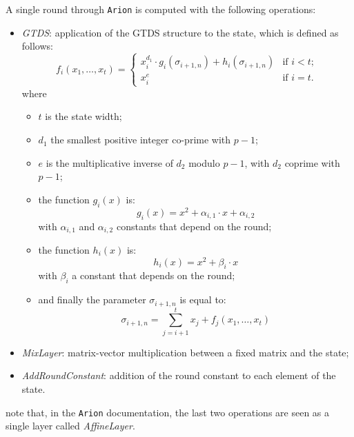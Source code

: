 \documentclass[12pt, a4paper]{report}
\begin{document}
A single round through \texttt{Arion} is computed with the following operations:
\begin{itemize}
  \item \textit{GTDS}: application of the GTDS structure to the state, which is defined as follows:
    \begin{equation}
      f_i(x_1, \ldots, x_t) = \left\{
          \begin{array}{ll}
            x_i^{d_1} \cdot g_i(\sigma_{i+1, n}) + h_i(\sigma_{i+1, n}) & \text{if } i < t; \\
            x_i^{e} & \text{if } i = t.
          \end{array}
        \right.
      \label{eq:gtds}
    \end{equation}
    where
    \begin{itemize}
      \item $t$ is the state width;
      \item $d_1$ the smallest positive integer co-prime with $p-1$;
      \item $e$ is the multiplicative inverse of $d_2$ modulo $p-1$, with $d_2$ coprime with $p-1$;
      \item the function $g_i(x)$ is:
        \begin{equation}
          g_i(x) = x^2 + \alpha_{i,1} \cdot x + \alpha_{i,2}
          \label{eq:g}
        \end{equation}
        with $\alpha_{i,1}$ and $\alpha_{i,2}$ constants that depend on the round;
      \item the function $h_i(x)$ is:
        \begin{equation}
          h_i(x) = x^2 + \beta_i \cdot x
          \label{eq:h}
        \end{equation}
        with $\beta_i$ a constant that depends on the round;
      \item and finally the parameter $\sigma_{i+1, n}$ is equal to:
        \begin{equation}
          \sigma_{i+1, n} = \sum_{j=i+1}^{t} x_j + f_j(x_1, \ldots, x_t)
          \label{eq:theta}
        \end{equation}
    \end{itemize}
  \item \textit{MixLayer}: matrix-vector multiplication between a fixed matrix and the state;
  \item \textit{AddRoundConstant}: addition of the round constant to each element of the state.
\end{itemize}
note that, in the \texttt{Arion} documentation\cite{arion}, the last two operations are seen as a single layer called \textit{AffineLayer}.
\end{document}
